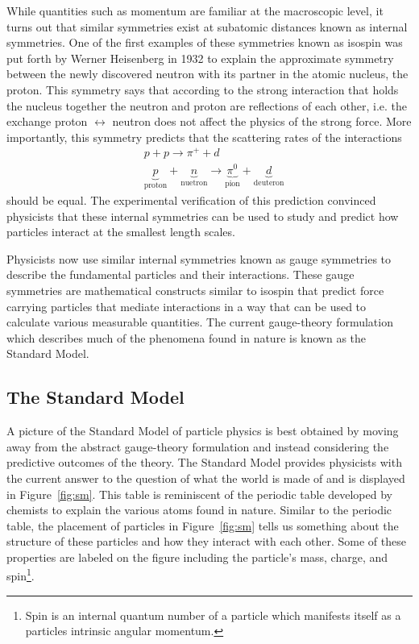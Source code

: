 While quantities such as momentum are familiar at the macroscopic level, 
it turns out that similar symmetries exist at subatomic distances
known as internal symmetries. One of the first examples of these symmetries
known as isospin was put forth by Werner Heisenberg in 1932 
to explain the approximate symmetry between
the newly discovered neutron with its partner in the atomic nucleus, the proton.
This symmetry says that according to the strong interaction that holds
the nucleus together the neutron and proton are reflections of each other,
i.e. the exchange proton $\leftrightarrow$ neutron does not affect the
physics of the strong force. More importantly, this symmetry predicts that the
scattering rates of the interactions
\begin{align*}
    & p + p \rightarrow \pi^+ + d \\
    & \underbrace{p}_{\text{proton}} + \underbrace{n}_{\text{nuetron}} \rightarrow \underbrace{\pi^0}_{\text{pion}} + \underbrace{d}_{\text{deuteron}}
\end{align*}
should be equal. The experimental verification of this prediction convinced
physicists that these internal symmetries can be used to study and predict
how particles interact at the smallest length scales.

Physicists now use similar internal symmetries known as gauge symmetries to
describe the fundamental particles and their interactions. These gauge symmetries
are mathematical constructs similar to isospin that predict force carrying 
particles that mediate interactions in a way that can be used to calculate
various measurable quantities. The current gauge-theory formulation which describes
much of the phenomena found in nature is known as the Standard Model.

\subsection{The Standard Model}
\label{subsec:StandardModel}
A picture of the Standard Model of particle physics is best obtained
by moving away from the abstract gauge-theory formulation and instead considering
the predictive outcomes of the theory. The Standard Model provides physicists with
the current answer to the question of what the world is made of and is displayed
in Figure~\ref{fig:sm}. This table is reminiscent
of the periodic table developed by chemists to explain the various atoms
found in nature. Similar to the periodic table, the placement of particles in 
Figure~\ref{fig:sm} tells us something about the structure of these particles and
how they interact with each other. Some of these properties are labeled on
the figure including the particle's mass, charge, and 
spin\footnote{Spin is an internal quantum number of a particle which manifests 
itself as a particles intrinsic angular momentum.}.

